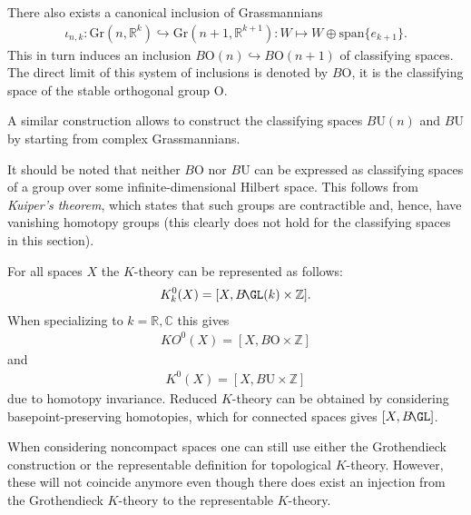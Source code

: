 {\begin{property}
        There also exists a canonical inclusion of Grassmannians
        \begin{gather}
            \iota_{n,k}:\mathrm{Gr}(n,\mathbb{R}^k)\hookrightarrow \mathrm{Gr}(n+1,\mathbb{R}^{k+1}):W\mapsto W\oplus\mathrm{span}\{e_{k+1}\}.
        \end{gather}
        This in turn induces an inclusion $B\mathrm{O}(n)\hookrightarrow B\mathrm{O}(n+1)$ of classifying spaces. The direct limit of this system of inclusions is denoted by $B\mathrm{O}$, it is the classifying space of the stable orthogonal group $\mathrm{O}$.
    \end{property}
    \begin{remark}
        A similar construction allows to construct the classifying spaces $B\mathrm{U}(n)$ and $B\mathrm{U}$ by starting from complex Grassmannians.
    \end{remark}
    \begin{remark}\label{k:kuiper_remark}
        It should be noted that neither $B\mathrm{O}$ nor $B\mathrm{U}$ can be expressed as classifying spaces of a group over some infinite-dimensional Hilbert space. This follows from \textit{Kuiper's theorem}, which states that such groups are contractible and, hence, have vanishing homotopy groups (this clearly does not hold for the classifying spaces in this section).
    \end{remark}

    \begin{property}
        For all spaces $X$ the $K$-theory can be represented as follows:
        \begin{gather}
            K^0_k(X) = [X,B\!\GL(k)\times\mathbb{Z}].
        \end{gather}
        When specializing to $k=\mathbb{R},\mathbb{C}$ this gives
        \begin{gather}
            KO^0(X) = [X,B\mathrm{O}\times\mathbb{Z}]
        \end{gather}
        and
        \begin{gather}
            K^0(X) = [X,B\mathrm{U}\times\mathbb{Z}]
        \end{gather}
        due to homotopy invariance. Reduced $K$-theory can be obtained by considering basepoint-preserving homotopies, which for connected spaces gives $[X,B\!\GL]$.
    \end{property}

    \begin{remark}
        When considering noncompact spaces one can still use either the Grothendieck construction or the representable definition for topological $K$-theory. However, these will not coincide anymore even though there does exist an injection from the Grothendieck $K$-theory to the representable $K$-theory.
    \end{remark}

}
